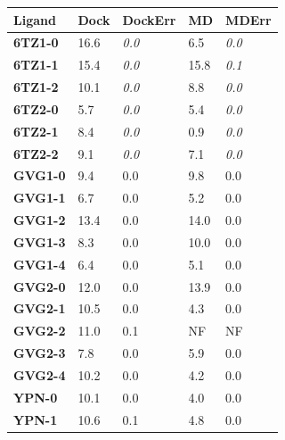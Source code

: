 \begin{table}[]
\begin{tabular}{|l|l|l|l|l|}
\hline
\textbf{Ligand} & \textbf{Dock} & \textbf{DockErr} & \textbf{MD} & \textbf{MDErr} \\ \hline
\textbf{6TZ1-0} & 16.6          & \textit{0.0}     & 6.5         & \textit{0.0}   \\ \hline
\textbf{6TZ1-1} & 15.4          & \textit{0.0}     & 15.8        & \textit{0.1}   \\ \hline
\textbf{6TZ1-2} & 10.1          & \textit{0.0}     & 8.8         & \textit{0.0}   \\ \hline
\textbf{6TZ2-0} & 5.7           & \textit{0.0}     & 5.4         & \textit{0.0}   \\ \hline
\textbf{6TZ2-1} & 8.4           & \textit{0.0}     & 0.9         & \textit{0.0}   \\ \hline
\textbf{6TZ2-2} & 9.1           & \textit{0.0}     & 7.1         & \textit{0.0}   \\ \hline
\textbf{GVG1-0} & 9.4           & 0.0              & 9.8         & 0.0            \\ \hline
\textbf{GVG1-1} & 6.7           & 0.0              & 5.2         & 0.0            \\ \hline
\textbf{GVG1-2} & 13.4          & 0.0              & 14.0        & 0.0            \\ \hline
\textbf{GVG1-3} & 8.3           & 0.0              & 10.0        & 0.0            \\ \hline
\textbf{GVG1-4} & 6.4           & 0.0              & 5.1         & 0.0            \\ \hline
\textbf{GVG2-0} & 12.0          & 0.0              & 13.9        & 0.0            \\ \hline
\textbf{GVG2-1} & 10.5          & 0.0              & 4.3         & 0.0            \\ \hline
\textbf{GVG2-2} & 11.0          & 0.1              & NF          & NF             \\ \hline
\textbf{GVG2-3} & 7.8           & 0.0              & 5.9         & 0.0            \\ \hline
\textbf{GVG2-4} & 10.2          & 0.0              & 4.2         & 0.0            \\ \hline
\textbf{YPN-0}  & 10.1          & 0.0              & 4.0         & 0.0            \\ \hline
\textbf{YPN-1}  & 10.6          & 0.1              & 4.8         & 0.0            \\ \hline

\end{tabular}
\end{table}
